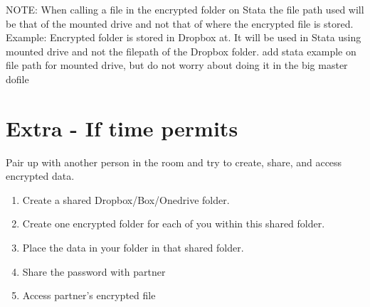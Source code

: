\documentclass{tufte-handout}
\begin{document}
NOTE: When calling a file in the encrypted folder on Stata the file path used will be that of the mounted drive and not that of where the encrypted file is stored. 
Example: Encrypted folder is stored in Dropbox at. It will be used in Stata using mounted drive and not the filepath of the Dropbox folder. add stata example on file path for mounted drive, but do not worry about doing it in the big master dofile
\section{Extra - If time permits}
Pair up with another person in the room and try to create, share, and access encrypted data.
\begin{enumerate}
	\item Create a shared Dropbox/Box/Onedrive folder.
	\item Create one encrypted folder for each of you within this shared folder.
	\item Place the data in your folder in that shared folder.
	\item Share the password with partner
	\item Access partner's encrypted file
\end{enumerate}
\end{document}
